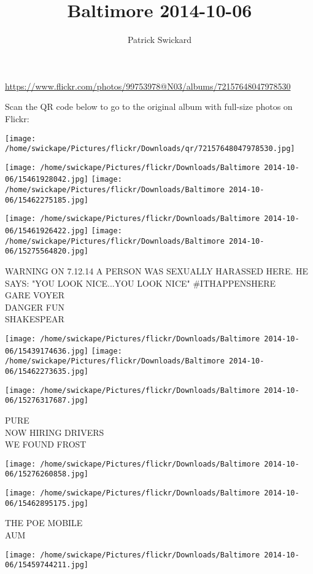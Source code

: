 \documentclass[10pt,letterpaper]{article}
\title{Baltimore 2014-10-06}
\author{Patrick Swickard}
\date{}
\begin{document}
\maketitle

\url{https://www.flickr.com/photos/99753978@N03/albums/72157648047978530}

Scan the QR code below to go to the original album with full-size photos on Flickr:

\texttt{[image: /home/swickape/Pictures/flickr/Downloads/qr/72157648047978530.jpg]}
\pagebreak

\texttt{[image: /home/swickape/Pictures/flickr/Downloads/Baltimore 2014-10-06/15461928042.jpg]}
\texttt{[image: /home/swickape/Pictures/flickr/Downloads/Baltimore 2014-10-06/15462275185.jpg]}

\texttt{[image: /home/swickape/Pictures/flickr/Downloads/Baltimore 2014-10-06/15461926422.jpg]}
\texttt{[image: /home/swickape/Pictures/flickr/Downloads/Baltimore 2014-10-06/15275564820.jpg]}

WARNING ON 7.12.14 A PERSON WAS SEXUALLY HARASSED HERE.  HE SAYS: "YOU LOOK NICE...YOU LOOK NICE" \#ITHAPPENSHERE\\
GARE VOYER\\
DANGER FUN\\
SHAKESPEAR
\pagebreak

\texttt{[image: /home/swickape/Pictures/flickr/Downloads/Baltimore 2014-10-06/15439174636.jpg]}
\texttt{[image: /home/swickape/Pictures/flickr/Downloads/Baltimore 2014-10-06/15462273635.jpg]}

\texttt{[image: /home/swickape/Pictures/flickr/Downloads/Baltimore 2014-10-06/15276317687.jpg]}

PURE\\
NOW HIRING DRIVERS\\
WE FOUND FROST
\pagebreak

\texttt{[image: /home/swickape/Pictures/flickr/Downloads/Baltimore 2014-10-06/15276260858.jpg]}

\vspace{0.25in}
\texttt{[image: /home/swickape/Pictures/flickr/Downloads/Baltimore 2014-10-06/15462895175.jpg]}

THE POE MOBILE\\
AUM
\pagebreak

\texttt{[image: /home/swickape/Pictures/flickr/Downloads/Baltimore 2014-10-06/15459744211.jpg]}
\end{document}
